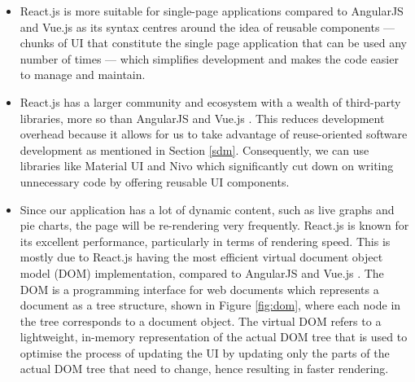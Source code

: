 \documentclass[12pt, a4paper]{article}
\begin{document}
\begin{itemize}
    \item React.js is more suitable for single-page applications compared to AngularJS and Vue.js as its syntax centres around the idea of reusable components \citep{arv} --- chunks of UI that constitute the single page application that can be used any number of times --- which simplifies development and makes the code easier to manage and maintain.
    
    \item React.js has a larger community and ecosystem with a wealth of third-party libraries, more so than AngularJS and Vue.js \citep{arv}. This reduces development overhead because it allows for us to take advantage of reuse-oriented software development as mentioned in Section \ref{sdm}. Consequently, we can use libraries like Material UI and Nivo which significantly cut down on writing unnecessary code by offering reusable UI components. 
    
    \item Since our application has a lot of dynamic content, such as live graphs and pie charts, the page will be re-rendering very frequently. React.js is known for its excellent performance, particularly in terms of rendering speed. This is mostly due to React.js having the most efficient virtual document object model (DOM) implementation, compared to AngularJS and Vue.js \citep{vdom}. The DOM is a programming interface for web documents which represents a document as a tree structure, shown in Figure \ref{fig:dom}, where each node in the tree corresponds to a document object. The virtual DOM refers to a lightweight, in-memory representation of the actual DOM tree that is used to optimise the process of updating the UI by updating only the parts of the actual DOM tree that need to change, hence resulting in faster rendering.


\end{itemize}
\end{document}
